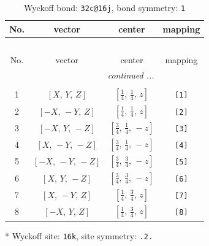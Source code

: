 \documentclass[fleqn,8pt]{jsarticle}
\begin{document}
\renewcommand{\arraystretch}{1.2}
\begin{longtable}{cccc}
\caption{Wyckoff bond: {\tt 32c@16j}, bond symmetry: {\tt 1}}
 \\
 \hline \hline
No. & vector & center & mapping \\ \hline \endfirsthead

\multicolumn{3}{l}{\tablename\ \thetable{}} \\
 \hline \hline
No. & vector & center & mapping \\ \hline \endhead

 \hline \hline
\multicolumn{3}{r}{\footnotesize\it continued ...} \\ \endfoot

 \hline \hline
\multicolumn{3}{r}{} \\ \endlastfoot

1 & $\left[ X,\, Y,\, Z \right]$ & $\left[ \frac{1}{4},\, \frac{1}{4},\, z \right]$ & {\tt [1]} \\ \hline
2 & $\left[ - X,\, - Y,\, Z \right]$ & $\left[ \frac{1}{4},\, \frac{1}{4},\, z \right]$ & {\tt [2]} \\ \hline
3 & $\left[ - X,\, Y,\, - Z \right]$ & $\left[ \frac{3}{4},\, \frac{1}{4},\, - z \right]$ & {\tt [3]} \\ \hline
4 & $\left[ X,\, - Y,\, - Z \right]$ & $\left[ \frac{3}{4},\, \frac{1}{4},\, - z \right]$ & {\tt [4]} \\ \hline
5 & $\left[ - X,\, - Y,\, - Z \right]$ & $\left[ \frac{3}{4},\, \frac{3}{4},\, - z \right]$ & {\tt [5]} \\ \hline
6 & $\left[ X,\, Y,\, - Z \right]$ & $\left[ \frac{3}{4},\, \frac{3}{4},\, - z \right]$ & {\tt [6]} \\ \hline
7 & $\left[ X,\, - Y,\, Z \right]$ & $\left[ \frac{1}{4},\, \frac{3}{4},\, z \right]$ & {\tt [7]} \\ \hline
8 & $\left[ - X,\, Y,\, Z \right]$ & $\left[ \frac{1}{4},\, \frac{3}{4},\, z \right]$ & {\tt [8]} \\
\end{longtable}
* Wyckoff site: {\tt 16k}, site symmetry: {\tt .2.}
\renewcommand{\arraystretch}{1.2}
\end{document}
